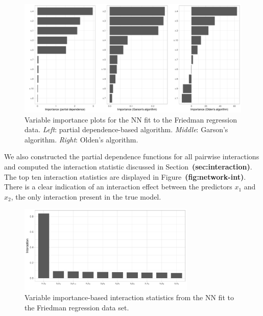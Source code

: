 \documentclass[12pt]{article}
\def\ref#1{\textbf{(#1)}}
\begin{document}
\begin{figure}[!htb]
  \centering
  \includegraphics[width=1.0\textwidth]{network-vip}
  \caption{Variable importance plots for the NN fit to the Friedman regression data. \textit{Left}: partial dependence-based algorithm. \textit{Middle}: Garson's algorithm. \textit{Right}: Olden's algorithm. \label{fig:network-vip}}
\end{figure}

We also constructed the partial dependence functions for all pairwise interactions and computed the interaction statistic discussed in Section~\ref{sec:interaction}. The top ten interaction statistics are displayed in Figure~\ref{fig:network-int}. There is a clear indication of an interaction effect between the predictors $x_1$ and $x_2$, the only interaction present in the true model.

\begin{figure}[!htb]
  \centering
  \includegraphics[width=0.75\textwidth]{network-int}
  \caption{Variable importance-based interaction statistics from the NN fit to the Friedman regression data set. \label{fig:network-int}}
\end{figure}
\end{document}
